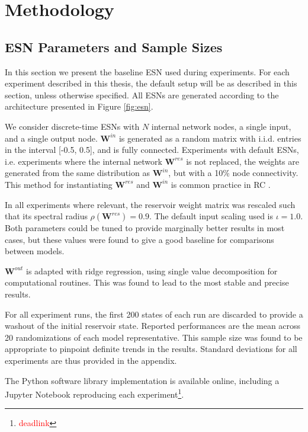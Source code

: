 \chapter{Methodology}

\section{ESN Parameters and Sample Sizes}

In this section we present the baseline ESN used during experiments. For each
experiment described in this thesis, the default setup will be as described in
this section, unless otherwise specified. All ESNs are generated according to
the architecture presented in Figure \ref{fig:esn}.

We consider discrete-time ESNs with $N$ internal network nodes, a single input,
and a single output node. $\mathbf{W}^{in}$ is generated as a random matrix with
i.i.d. entries in the interval [-0.5, 0.5], and is fully connected. Experiments
with default ESNs, i.e. experiments where the internal network
$\mathbf{W}^{res}$ is not replaced, the weights are generated from the same
distribution as $\mathbf{W}^{in}$, but with a 10\% node connectivity. This
method for instantiating $\mathbf{W}^{res}$ and $\mathbf{W}^{in}$ is common
practice in RC \cite{montavon_practical_2012}.

In all experiments where relevant, the reservoir weight matrix was rescaled such
that its spectral radius $\rho(\mathbf{W}^{res}) = 0.9$. The default input
scaling used is $\iota = 1.0$. Both parameters could be tuned to provide
marginally better results in most cases, but these values were found to give a
good baseline for comparisons between models.

$\mathbf{W}^{out}$ is adapted with ridge regression, using single value
decomposition for computational routines. This was found to lead to the most
stable and precise results.

For all experiment runs, the first 200 states of each run are discarded to
provide a washout of the initial reservoir state. Reported performances are the
mean across 20 randomizations of each model representative. This sample size was
found to be appropriate to pinpoint definite trends in the results. Standard
deviations for all experiments are thus provided in the appendix.

The Python software library implementation is available online, including a
Jupyter Notebook reproducing each
experiment\footnote{\textcolor{red}{deadlink}}.

